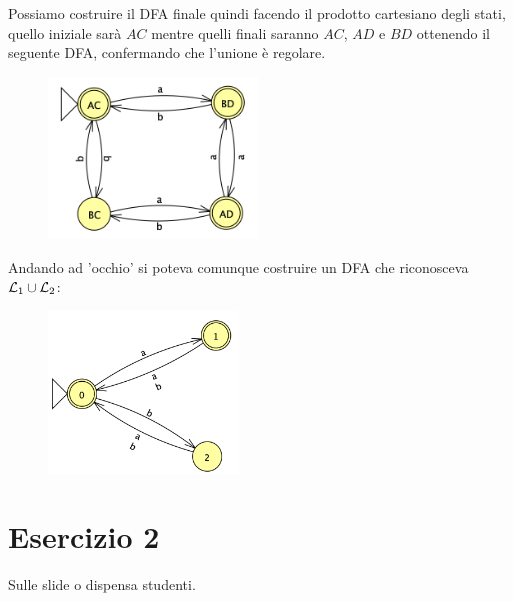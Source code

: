 \documentclass[11pt]{article}
\begin{document}
\begin{tcolorbox}[colframe=orange!70!black, colback=orange!10!white, title=\textbf{\textit{Nota \sout{inutile ai fini dell'esercizio}:}}]
Possiamo costruire il DFA finale quindi facendo il prodotto cartesiano
degli stati, quello iniziale sarà $AC$ mentre quelli finali saranno 
$AC$, $AD$ e $BD$ ottenendo il seguente DFA, confermando che l'unione 
è regolare.
\begin{figure}[H]
  \centering
  \includegraphics[height=4.3cm]{img/01Unione.png}
  \label{fig:01-DFA-unione}
\end{figure}
\noindent Andando ad 'occhio' si poteva comunque costruire un DFA 
che riconosceva ${\cal L}_1 \cup {\cal L}_2$:
\begin{figure}[H]
  \centering
  \includegraphics[height=4.3cm]{img/01Unione-1.png}
  \label{fig:01-DFA-unione-1}
\end{figure} 
\end{tcolorbox}
\section*{Esercizio 2}
Sulle slide o dispensa studenti.
\newpage
\end{document}
